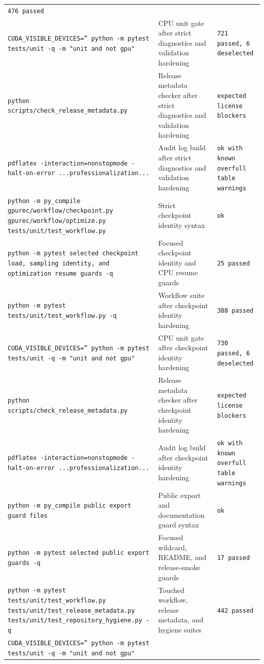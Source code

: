 \documentclass[11pt]{article}
\begin{document}
\begin{center}
\begin{tabular}{lll}
\texttt{476 passed} \\
\texttt{CUDA\_VISIBLE\_DEVICES='' python -m pytest tests/unit -q -m "unit and not gpu"} &
CPU unit gate after strict diagnostics and validation hardening &
\texttt{721 passed, 6 deselected} \\
\texttt{python scripts/check\_release\_metadata.py} &
Release metadata checker after strict diagnostics and validation hardening &
\texttt{expected license blockers} \\
\texttt{pdflatex -interaction=nonstopmode -halt-on-error ...professionalization...} &
Audit log build after strict diagnostics and validation hardening &
\texttt{ok with known overfull table warnings} \\
\texttt{python -m py\_compile gpurec/workflow/checkpoint.py gpurec/workflow/optimize.py tests/unit/test\_workflow.py} &
Strict checkpoint identity syntax &
\texttt{ok} \\
\texttt{python -m pytest selected checkpoint load, sampling identity, and optimization resume guards -q} &
Focused checkpoint identity and CPU resume guards &
\texttt{25 passed} \\
\texttt{python -m pytest tests/unit/test\_workflow.py -q} &
Workflow suite after checkpoint identity hardening &
\texttt{388 passed} \\
\texttt{CUDA\_VISIBLE\_DEVICES='' python -m pytest tests/unit -q -m "unit and not gpu"} &
CPU unit gate after checkpoint identity hardening &
\texttt{730 passed, 6 deselected} \\
\texttt{python scripts/check\_release\_metadata.py} &
Release metadata checker after checkpoint identity hardening &
\texttt{expected license blockers} \\
\texttt{pdflatex -interaction=nonstopmode -halt-on-error ...professionalization...} &
Audit log build after checkpoint identity hardening &
\texttt{ok with known overfull table warnings} \\
\texttt{python -m py\_compile public export guard files} &
Public export and documentation guard syntax &
\texttt{ok} \\
\texttt{python -m pytest selected public export guards -q} &
Focused wildcard, README, and release-smoke guards &
\texttt{17 passed} \\
\texttt{python -m pytest tests/unit/test\_workflow.py tests/unit/test\_release\_metadata.py tests/unit/test\_repository\_hygiene.py -q} &
Touched workflow, release metadata, and hygiene suites &
\texttt{442 passed} \\
\texttt{CUDA\_VISIBLE\_DEVICES='' python -m pytest tests/unit -q -m "unit and not gpu"} &

\end{tabular}
\end{center}
\end{document}
